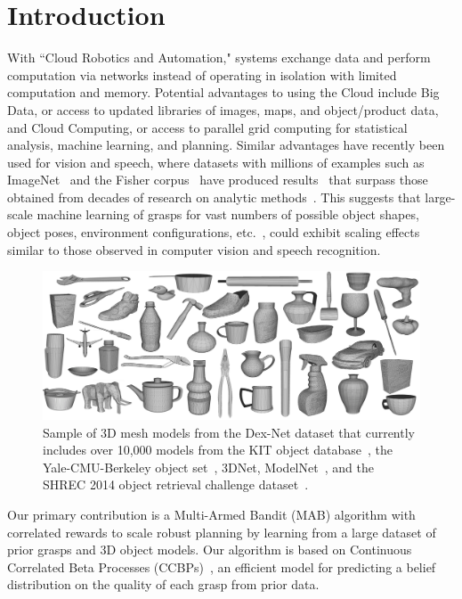 \section{Introduction}

With ``Cloud Robotics and Automation," systems exchange data and perform computation via networks instead of operating in isolation with limited computation and memory.
Potential advantages to using the Cloud include Big Data, or access to updated libraries of images, maps, and object/product data, and Cloud Computing, or access to parallel grid computing for statistical analysis, machine learning, and planning.
Similar advantages have recently been used for vision and speech, where datasets with millions of examples such as ImageNet~\cite{deng2009imagenet} and the Fisher corpus~\cite{cieri2004fisher} have produced results~\cite{hannun2014deepspeech, hays2008im2gps, krizhevsky2012imagenet} that surpass those obtained from decades of research on analytic methods~\cite{kehoe2015survey}.
This suggests that large-scale machine learning of grasps for vast numbers of possible object shapes, object poses, environment configurations, etc.~\cite{goldfeder2011data, lenz2015deep, kappler2015leveraging}, could exhibit scaling effects similar to those observed in computer vision and speech recognition.

\begin{figure}[t!]
\centering
\includegraphics[scale=0.085]{figures/dexnet_collage.jpg}
\caption{Sample of 3D mesh models from the Dex-Net dataset that currently includes over 10,000 models from the KIT object database~\cite{kasper2012kit}, the Yale-CMU-Berkeley object set~\cite{calli2015benchmarking}, 3DNet\cite{wohlkinger20123dnet}, ModelNet~\cite{wu20143d}, and the SHREC 2014 object retrieval challenge dataset~\cite{li2015comparison}. }
\vspace*{-15pt}
\end{figure}

Our primary contribution is a Multi-Armed Bandit (MAB) algorithm with correlated rewards to scale robust planning by learning from a large dataset of prior grasps and 3D object models.
Our algorithm is based on Continuous Correlated Beta Processes (CCBPs)~\cite{goetschalckx2011continuous, montesano2012active}, an efficient model for predicting a belief distribution on the quality of each grasp from prior data.

